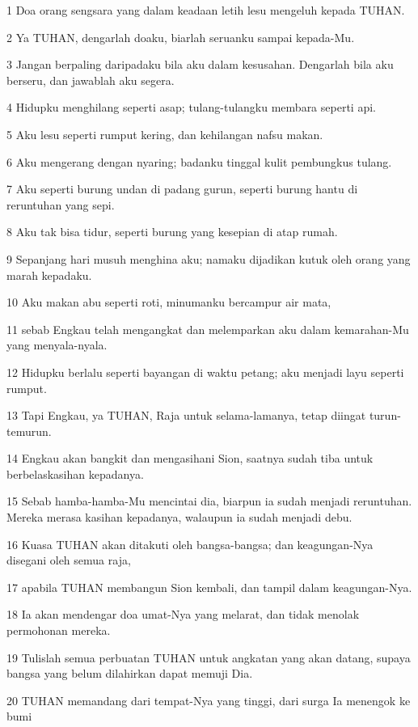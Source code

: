 \par 1 Doa orang sengsara yang dalam keadaan letih lesu mengeluh kepada TUHAN.
\par 2 Ya TUHAN, dengarlah doaku, biarlah seruanku sampai kepada-Mu.
\par 3 Jangan berpaling daripadaku bila aku dalam kesusahan. Dengarlah bila aku berseru, dan jawablah aku segera.
\par 4 Hidupku menghilang seperti asap; tulang-tulangku membara seperti api.
\par 5 Aku lesu seperti rumput kering, dan kehilangan nafsu makan.
\par 6 Aku mengerang dengan nyaring; badanku tinggal kulit pembungkus tulang.
\par 7 Aku seperti burung undan di padang gurun, seperti burung hantu di reruntuhan yang sepi.
\par 8 Aku tak bisa tidur, seperti burung yang kesepian di atap rumah.
\par 9 Sepanjang hari musuh menghina aku; namaku dijadikan kutuk oleh orang yang marah kepadaku.
\par 10 Aku makan abu seperti roti, minumanku bercampur air mata,
\par 11 sebab Engkau telah mengangkat dan melemparkan aku dalam kemarahan-Mu yang menyala-nyala.
\par 12 Hidupku berlalu seperti bayangan di waktu petang; aku menjadi layu seperti rumput.
\par 13 Tapi Engkau, ya TUHAN, Raja untuk selama-lamanya, tetap diingat turun-temurun.
\par 14 Engkau akan bangkit dan mengasihani Sion, saatnya sudah tiba untuk berbelaskasihan kepadanya.
\par 15 Sebab hamba-hamba-Mu mencintai dia, biarpun ia sudah menjadi reruntuhan. Mereka merasa kasihan kepadanya, walaupun ia sudah menjadi debu.
\par 16 Kuasa TUHAN akan ditakuti oleh bangsa-bangsa; dan keagungan-Nya disegani oleh semua raja,
\par 17 apabila TUHAN membangun Sion kembali, dan tampil dalam keagungan-Nya.
\par 18 Ia akan mendengar doa umat-Nya yang melarat, dan tidak menolak permohonan mereka.
\par 19 Tulislah semua perbuatan TUHAN untuk angkatan yang akan datang, supaya bangsa yang belum dilahirkan dapat memuji Dia.
\par 20 TUHAN memandang dari tempat-Nya yang tinggi, dari surga Ia menengok ke bumi
